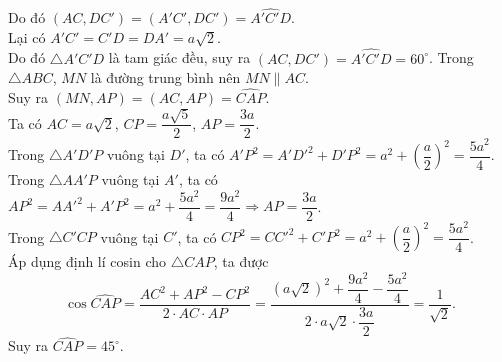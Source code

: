\begin{ex}
{\begin{itemchoice}
			Do đó $(AC,DC')  = (A'C',DC') = \widehat{A'C'D}$.\\
			Lại có $A'C'=C'D=DA'=a\sqrt{2}$.\\ 
			Do đó $\triangle A'C'D$ là tam giác  đều, suy ra $(AC,DC')=\widehat{A'C'D} = 60^\circ$.
			 \itemch
			Trong $\triangle ABC$, $MN$ là đường trung  bình nên $MN \parallel AC$.\\
			Suy ra $(MN, AP) = (AC, AP) =  \widehat{CAP}$.\\
			 Ta có $AC = a\sqrt{2}$, $CP=\dfrac{a\sqrt{5}}{2}$, $AP=\dfrac{3a}{2}$.\\
			Trong $\triangle A'D'P$ vuông tại $D'$, ta có $A'P^2 = A'D'^2 + D'P^2 = a^2 + \left(\dfrac{a}{2}\right)^2 =  \dfrac{5a^2}{4}$.\\
			Trong $\triangle AA'P$ vuông tại $A'$, ta có $AP^2 = AA'^2 + A'P^2 = a^2 + \dfrac{5a^2}{4} = \dfrac{9a^2}{4} \Rightarrow  AP = \dfrac{3a}{2}$.\\
			Trong $\triangle C'CP$ vuông tại $C'$, ta có $CP^2 = CC'^2 + C'P^2 = a^2 +  \left(\dfrac{a}{2}\right)^2 = \dfrac{5a^2}{4}$.\\
			Áp dụng định lí  cosin cho $\triangle CAP$, ta được
			$$\cos \widehat{CAP} = \dfrac{AC^2 + AP^2 - CP^2}{2 \cdot AC \cdot AP} = \dfrac{(a\sqrt{2})^2 + \dfrac{9a^2}{4} - \dfrac{5a^2}{4}}{2  \cdot a\sqrt{2} \cdot \dfrac{3a}{2}} = \dfrac{1}{\sqrt{2}}.$$
			Suy ra  $\widehat{CAP} = 45^\circ$.
		\end{itemchoice}
	} 
\end{ex}

